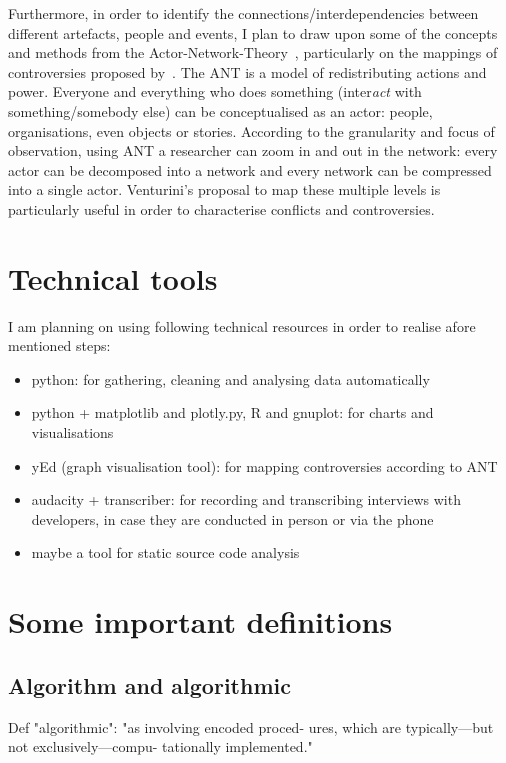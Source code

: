 \documentclass[pdftex,a4paper,11pt]{scrartcl}
\begin{document}
Furthermore, in order to identify the connections/interdependencies between different artefacts, people and events, I plan to draw upon some of the concepts and methods from the Actor-Network-Theory~\cite{Latour2010}, particularly on the mappings of controversies proposed by~\cite{Venturini2010a}.
The ANT is a model of redistributing actions and power.
Everyone and everything who does something (inter\emph{act} with something/somebody else) can be conceptualised as an actor: people, organisations, even objects or stories.
According to the granularity and focus of observation, using ANT a researcher can zoom in and out in the network: every actor can be decomposed into a network and every network can be compressed into a single actor.
Venturini's proposal to map these multiple levels is particularly useful in order to characterise conflicts and controversies.


\section{Technical tools}

I am planning on using following technical resources in order to realise afore mentioned steps:

\begin{itemize}
    \item python: for gathering, cleaning and analysing data automatically
    \item python + matplotlib and plotly.py, R and gnuplot: for charts and visualisations
    \item yEd (graph visualisation tool): for mapping controversies according to ANT
    \item audacity + transcriber: for recording and transcribing interviews with developers, in case they are conducted in person or via the phone
    \item maybe a tool for static source code analysis
\end{itemize}

\section{Some important definitions}

\subsection{Algorithm and algorithmic}
Def "algorithmic": "as involving encoded proced-
ures, which are typically—but not exclusively—compu-
tationally implemented."~\cite{Geiger2017}
\end{document}
